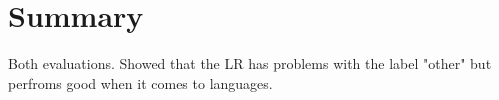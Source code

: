 \section{Summary}\label{sec:Summary}

Both evaluations. Showed that the LR has problems with the label "other" but perfroms good when it comes to languages.